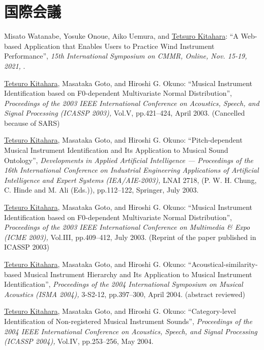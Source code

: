 \section*{国際会議}
\begin{Enumerate}
  
\item 
Misato Watanabe, 
Yosuke Onoue, 
Aiko Uemura, 
and 
\underline{Tetsuro Kitahara}: 
    ``A Web-based Application that Enables Users to Practice Wind Instrument Performance'', 
    {\it 15th International Symposium on CMMR, Online, Nov. 15-19, 2021,
    } . 

\item 
\underline{Tetsuro Kitahara}, 
Masataka Goto, 
and 
Hiroshi
      G. Okuno: 
    ``Musical Instrument Identification based on F0-dependent Multivariate Normal Distribution'', 
    {\it Proceedings of
      the 2003 IEEE International Conference on Acoustics, Speech, and Signal Processing
          (ICASSP 2003),
        } Vol.V, pp.421--424, April 2003. 
(Cancelled because of SARS)
\item 
\underline{Tetsuro Kitahara}, 
Masataka Goto, 
and 
Hiroshi
      G. Okuno: 
    ``Pitch-dependent Musical Instrument Identification and Its Application to Musical Sound
      Ontology'', 
    {\it Developments in Applied Artificial Intelligence --- Proceedings of the 16th
      International Conference on Industrial Engineering Applications of Artificial Intelligence and
      Expert Systems (IEA/AIE-2003),
    } LNAI 2718, (P. W. H. Chung, C. Hinde and M. Ali (Eds.)), pp.112--122, Springer, July 2003. 

\item 
\underline{Tetsuro Kitahara}, 
Masataka Goto, 
and 
Hiroshi
      G. Okuno: 
    ``Musical Instrument Identification based on F0-dependent Multivariate Normal Distribution'', 
    {\it Proceedings of the 2003 IEEE International Conference
      on Multimedia \& Expo
          (ICME 2003),
        } Vol.III, pp.409--412, July 2003. 
(Reprint of the paper published in ICASSP 2003)
\item 
\underline{Tetsuro Kitahara}, 
Masataka Goto, 
and 
Hiroshi
      G. Okuno: 
    ``Acoustical-similarity-based Musical Instrument Hierarchy and Its Application to Musical
      Instrument Identification'', 
    {\it Proceedings of the 2004 International Symposium on
      Musical Acoustics
          (ISMA 2004),
        } 3-S2-12, pp.397--300, April 2004. 
(abstract reviewed)
\item 
\underline{Tetsuro Kitahara}, 
Masataka Goto, 
and 
Hiroshi
      G. Okuno: 
    ``Category-level Identification of Non-registered Musical Instrument Sounds'', 
    {\it Proceedings of
      the 2004 IEEE International Conference on Acoustics, Speech, and Signal Processing
          (ICASSP 2004),
        } Vol.IV, pp.253--256, May 2004. 


\end{Enumerate}
